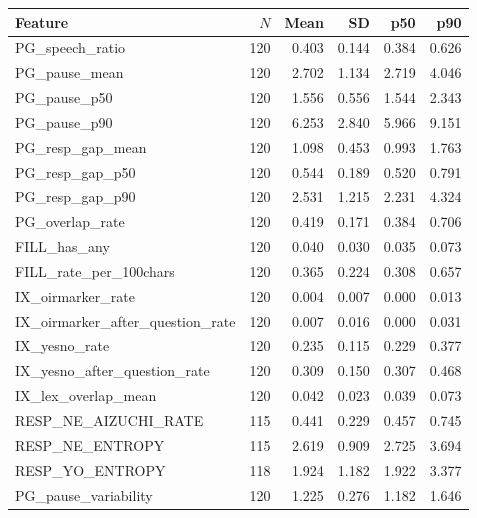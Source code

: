 \begin{tabular}{lrrrrr}
\toprule
Feature & $N$ & Mean & SD & p50 & p90 \\
\midrule
PG\_speech\_ratio & 120 & 0.403 & 0.144 & 0.384 & 0.626 \\
PG\_pause\_mean & 120 & 2.702 & 1.134 & 2.719 & 4.046 \\
PG\_pause\_p50 & 120 & 1.556 & 0.556 & 1.544 & 2.343 \\
PG\_pause\_p90 & 120 & 6.253 & 2.840 & 5.966 & 9.151 \\
PG\_resp\_gap\_mean & 120 & 1.098 & 0.453 & 0.993 & 1.763 \\
PG\_resp\_gap\_p50 & 120 & 0.544 & 0.189 & 0.520 & 0.791 \\
PG\_resp\_gap\_p90 & 120 & 2.531 & 1.215 & 2.231 & 4.324 \\
PG\_overlap\_rate & 120 & 0.419 & 0.171 & 0.384 & 0.706 \\
FILL\_has\_any & 120 & 0.040 & 0.030 & 0.035 & 0.073 \\
FILL\_rate\_per\_100chars & 120 & 0.365 & 0.224 & 0.308 & 0.657 \\
IX\_oirmarker\_rate & 120 & 0.004 & 0.007 & 0.000 & 0.013 \\
IX\_oirmarker\_after\_question\_rate & 120 & 0.007 & 0.016 & 0.000 & 0.031 \\
IX\_yesno\_rate & 120 & 0.235 & 0.115 & 0.229 & 0.377 \\
IX\_yesno\_after\_question\_rate & 120 & 0.309 & 0.150 & 0.307 & 0.468 \\
IX\_lex\_overlap\_mean & 120 & 0.042 & 0.023 & 0.039 & 0.073 \\
RESP\_NE\_AIZUCHI\_RATE & 115 & 0.441 & 0.229 & 0.457 & 0.745 \\
RESP\_NE\_ENTROPY & 115 & 2.619 & 0.909 & 2.725 & 3.694 \\
RESP\_YO\_ENTROPY & 118 & 1.924 & 1.182 & 1.922 & 3.377 \\
PG\_pause\_variability & 120 & 1.225 & 0.276 & 1.182 & 1.646 \\
\bottomrule
\end{tabular}
